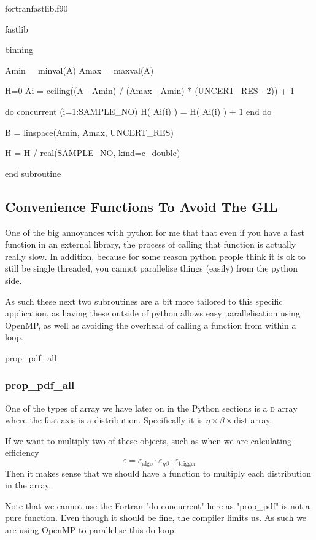 \documentclass[10pt, a4paper]{article}
\newcommand{\nd}[1]{\oldstylenums{#1}\textsc{d}}
\begin{document}
\begin{subfile}{fortran}{fastlib.f90}
\begin{codeblock}[noref]{fastlib}
\begin{codeblock}{binning}
\begin{code}
	Amin = minval(A)
	Amax = maxval(A)
	
	H=0
	Ai = ceiling((A - Amin) / (Amax - Amin) * (UNCERT_RES - 2)) + 1
	
	do concurrent (i=1:SAMPLE_NO)
		H( Ai(i) ) = H( Ai(i) ) + 1 
	end do 

	B = linspace(Amin, Amax, UNCERT_RES)
	
	H = H / real(SAMPLE_NO, kind=c_double)
	
end subroutine
\end{code}
\end{codeblock}

\subsection{Convenience Functions To Avoid The GIL}


One of the big annoyances with python for me that that even if you have a fast function in an external library, the process of calling that function is actually really slow. 
In addition, because for some reason python people think it is ok to still be single threaded, you cannot parallelise things (easily) from the python side.

As such these next two subroutines are a bit more tailored to this specific application, as having these outside of python allows easy parallelisation using OpenMP, as well as avoiding the overhead of calling a function from within a loop. 


\begin{codeblock}{prop_pdf_all}
\subsubsection{prop\_pdf\_all}


One of the types of array we have later on in the Python sections is a \nd{3} array where the fast axis is a distribution. Specifically it is $\eta \times \beta \times \text{dist}$ array. 

If we want to multiply two of these objects, such as when we are calculating efficiency
\begin{equation}
\varepsilon = \varepsilon_\text{algo} \cdot \varepsilon_{\eta \beta} \cdot \varepsilon_\text{trigger}
\end{equation}
Then it makes sense that we should have a function to multiply each distribution in the array. 

Note that we cannot use the Fortran "do concurrent" here as "prop_pdf" is not a pure function. Even though it should be fine, the compiler limits us. As such we are using OpenMP to parallelise this do loop. 


\end{codeblock}
\end{codeblock}
\end{subfile}
\end{document}
